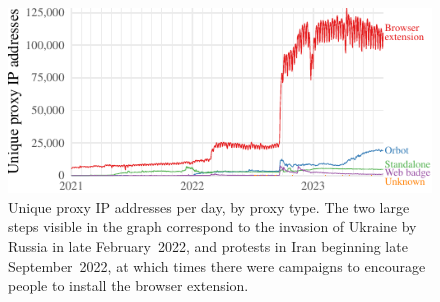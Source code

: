 \documentclass[letterpaper,twocolumn]{article}
\begin{document}
\begin{figure}
\includegraphics{figures/proxies/proxy-type}
\caption{
Unique proxy IP addresses per day,
by proxy type.
The two large steps visible in the graph correspond
to the invasion of Ukraine by Russia in late February~2022,
and protests in Iran beginning late September~2022,
at which times there were campaigns
to encourage people to install the browser extension.
}
\label{fig:proxy-type}

\end{figure}
\end{document}
